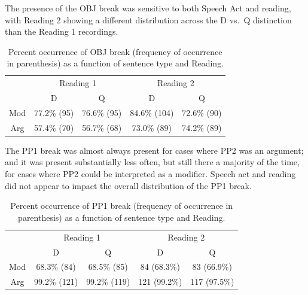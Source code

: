 \documentclass[12pt,oneside]{book}
\begin{document}

The presence of the OBJ break was sensitive to both Speech Act and reading, with Reading 2 showing a different distribution across the D vs.~Q distinction than the Reading 1 recordings.

\begin{table}[!h]

\caption{\label{tab:obj}Percent occurrence of OBJ break (frequency of occurrence in parenthesis) as a function of sentence type and Reading.}
\centering
\begin{tabular}{ccccc}
\toprule
\multicolumn{1}{c}{ } & \multicolumn{2}{c}{Reading 1} & \multicolumn{2}{c}{Reading 2} \\
\cmidrule(l{3pt}r{3pt}){2-3} \cmidrule(l{3pt}r{3pt}){4-5}
 & D & Q & D & Q\\
\midrule
Mod & 77.2\% (95) & 76.6\% (95) & 84.6\% (104) & 72.6\% (90)\\
Arg & 57.4\% (70) & 56.7\% (68) & 73.0\% (89) & 74.2\% (89)\\
\bottomrule
\end{tabular}
\end{table}


The PP1 break was almost always present for cases where PP2 was an argument; and it was present substantially less often, but still there a majority of the time, for cases where PP2 could be interpreted as a modifier. Speech act and reading did not appear to impact the overall distribution of the PP1 break.

\begin{table}[!h]

\caption{\label{tab:pp1}Percent occurrence of PP1 break (frequency of occurrence in parenthesis) as a function of sentence type and Reading.}
\centering
\begin{tabular}{ccccc}
\toprule
\multicolumn{1}{c}{ } & \multicolumn{2}{c}{Reading 1} & \multicolumn{2}{c}{Reading 2} \\
\cmidrule(l{3pt}r{3pt}){2-3} \cmidrule(l{3pt}r{3pt}){4-5}
 & D & Q & D & Q\\
\midrule
Mod & 68.3\% (84) & 68.5\% (85) & 84 (68.3\%) & 83 (66.9\%)\\
Arg & 99.2\% (121) & 99.2\% (119) & 121 (99.2\%) & 117 (97.5\%)\\
\bottomrule
\end{tabular}
\end{table}
\end{document}
